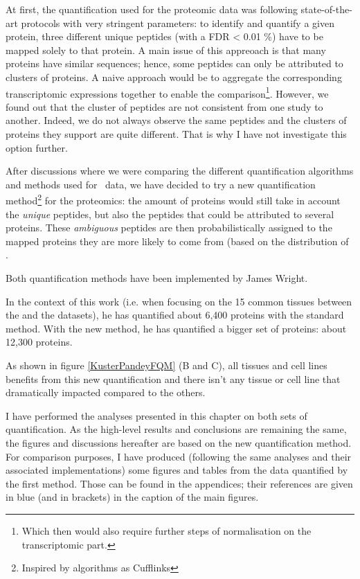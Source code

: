 At first, the quantification used for the proteomic data was following
state-of-the-art protocols with very stringent parameters:
to identify and quantify a given protein, three different unique peptides
(with a FDR < 0.01 \%) have to be mapped solely to that protein. A main issue of
this appreoach is that many proteins have similar sequences; hence, some peptides
can only be attributed to clusters of proteins. A naive approach would be to
aggregate the corresponding transcriptomic expressions together to enable the
comparison\footnote{Which then would also require further steps of normalisation
on the transcriptomic part.}. However, we found out that the cluster of peptides
are not consistent from one study to another. Indeed, we do not always observe the
same peptides and the clusters of proteins they support are quite different.
That is why I have not investigate this option further.

After discussions where we were comparing the different quantification algorithms
and methods used for \Rnaseq\ data, we have decided to try a new quantification
method\footnote{Inspired by algorithms as Cufflinks} for the proteomics:
the amount of proteins would still take in account the \emph{unique} peptides,
but also the peptides that could be attributed to several proteins.
These \emph{ambiguous} peptides are then probabilistically assigned to the
mapped proteins they are more likely to come from (based on the distribution of .

Both quantification methods have been implemented by James Wright.

In the context of this work (i.e. when focusing on the 15 common tissues between
the  and the  datasets),
he has quantified about 6,400 proteins with
the standard method. With the new method, he has quantified a bigger set of
proteins: about 12,300 proteins.

As shown in figure \ref{KusterPandeyFQM} (B and C),
all tissues and cell lines benefits from this new quantification and there isn't
any tissue or cell line that dramatically impacted compared to the others.


I have performed the analyses presented in this chapter on both sets of
quantification. As the high-level results and conclusions are remaining the same,
the figures and discussions hereafter are based on
the new quantification method. For comparison purposes,
I have produced (following the same analyses and their associated implementations)
some figures and tables from the data quantified by the first method.
Those can be found in the appendices; their references
are given in blue (and in brackets) in the caption of the main figures.



